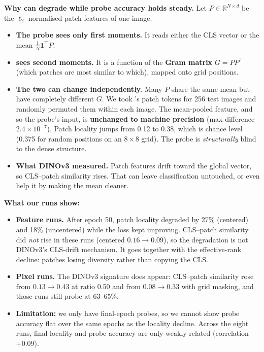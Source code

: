 \documentclass[11pt]{article}
\newcommand{\run}[1]{\texttt{\detokenize{#1}}}
\begin{document}
\textbf{Why \run{patch_locality} can degrade while probe accuracy holds steady.} Let $P\in\mathbb R^{N\times d}$ be the $\ell_2$-normalised patch features of one image.
\begin{itemize}
  \item \textbf{The probe sees only first moments.} It reads either the CLS vector or the mean $\tfrac1N\mathbf 1^\top P$.
  \item \textbf{\run{patch_locality} sees second moments.} It is a function of the \textbf{Gram matrix} $G=PP^\top$ (which patches are most similar to which), mapped onto grid positions.
  \item \textbf{The two can change independently.} Many $P$ share the same mean but have completely different $G$. We took \run{feat75}'s patch tokens for 256 test images and randomly permuted them within each image. The mean-pooled feature, and so the probe's input, is \textbf{unchanged to machine precision} (max difference $2.4\times10^{-7}$). Patch locality jumps from 0.12 to 0.38, which is chance level (0.375 for random positions on an $8\times8$ grid). The probe is \emph{structurally} blind to the dense structure.
  \item \textbf{What DINOv3 measured.} Patch features drift toward the global vector, so CLS--patch similarity rises. That can leave classification untouched, or even help it by making the mean cleaner.
\end{itemize}

\textbf{What our runs show:}
\begin{itemize}
  \item \textbf{Feature runs.} After epoch 50, patch locality degraded by 27\% (centered) and 18\% (uncentered) while the loss kept improving. CLS--patch similarity did \emph{not} rise in these runs (centered $0.16\to0.09$), so the degradation is not DINOv3's CLS-drift mechanism. It goes together with the effective-rank decline: patches losing diversity rather than copying the CLS.
  \item \textbf{Pixel runs.} The DINOv3 signature does appear: CLS--patch similarity rose from $0.13\to0.43$ at ratio 0.50 and from $0.08\to0.33$ with grid masking, and those runs still probe at 63--65\%.
  \item \textbf{Limitation:} we only have final-epoch probes, so we cannot show probe accuracy flat over the same epochs as the locality decline. Across the eight runs, final locality and probe accuracy are only weakly related (correlation $+0.09$).
\end{itemize}
\end{document}
